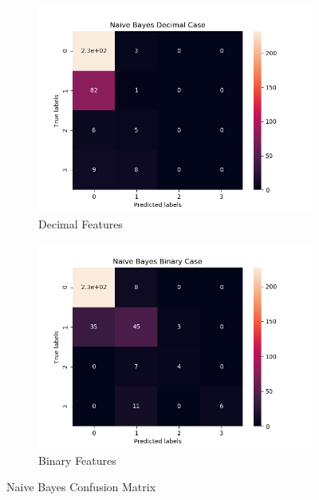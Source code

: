 \begin{figure}[H]
     \centering
     
     \begin{subfigure}[b]{0.48\textwidth}
         \centering
         \includegraphics[width=\textwidth]{../Figures/Naive Bayes Decimal Case_conf_mat.png}
         \caption{Decimal Features}
     \end{subfigure}
     \hfill
     \begin{subfigure}[b]{0.48\textwidth}
         \centering
         \includegraphics[width=\textwidth]{../Figures/Naive Bayes Binary Case_conf_mat.png}
         \caption{Binary Features}
     \end{subfigure}
     \caption{Naive Bayes Confusion Matrix}
\end{figure}

